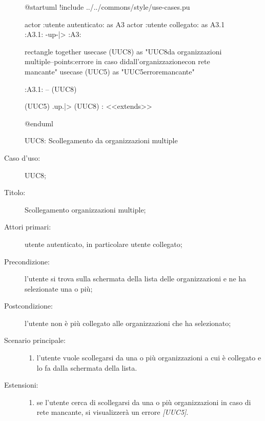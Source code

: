 \documentclass[../../../analisi-dei-requisiti.tex]{subfiles}
\begin{document}
\begin{figure}[H]
  \centering
  \begin{plantuml}
  @startuml
  !include ../../commons/style/use-cases.pu

  actor :utente autenticato: as A3
  actor :utente collegato: as A3.1
  :A3.1: -up-|> :A3:

  rectangle {
    together {
      usecase (UUC8) as "UUC8\nScollegamento da organizzazioni multiple\n--\nExtension points:\nVisualizzazione errore in caso di\nscollegamento dall'organizzazione\n con rete mancante"
      usecase (UUC5) as "UUC5\nVisualizzazione errore\nrete mancante"
    }
  }

  :A3.1: -- (UUC8)

  (UUC5) .up.|> (UUC8) : <<extends>>

  @enduml
  \end{plantuml}
  \caption{UUC8: Scollegamento da organizzazioni multiple}%
  \label{fig:uuc8}
\end{figure}

\begin{description}
  \item[Caso d’uso:] UUC8;
  \item[Titolo:] Scollegamento organizzazioni multiple;
  \item[Attori primari:] utente autenticato, in particolare utente collegato;
  \item[Precondizione:] l'utente si trova sulla schermata della lista delle organizzazioni e ne ha selezionate una o più;
  \item[Postcondizione:] l'utente non è più collegato alle organizzazioni che ha selezionato;
  \item[Scenario principale:]
        \begin{enumerate}
          \item l'utente vuole scollegarsi da una o più organizzazioni a cui è collegato e lo fa dalla schermata della lista.
        \end{enumerate}
  \item[Estensioni:]
        \begin{enumerate}
          \item se l'utente cerca di scollegarsi da una o più organizzazioni in caso di rete mancante, si visualizzerà un errore \emph{[UUC5]}.
        \end{enumerate}
\end{description}
\end{document}
